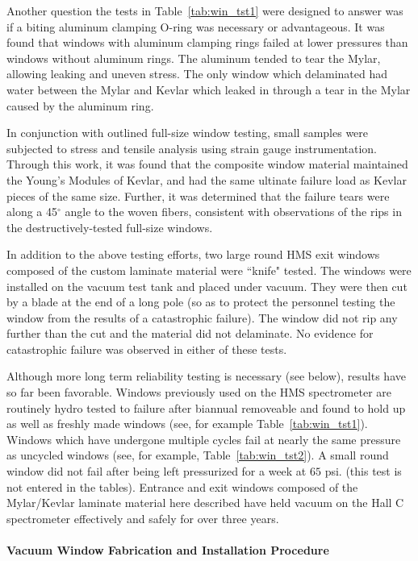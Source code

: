 Another question the tests in Table~\ref{tab:win_tst1} were designed to
answer was if
a biting aluminum clamping O-ring was necessary or advantageous. It was found
that windows with aluminum clamping rings failed at lower pressures than
windows without aluminum rings. The aluminum tended to tear the Mylar, allowing
leaking and uneven stress. The only window which delaminated had water between
the Mylar and Kevlar which leaked in through a tear in the
Mylar caused by the aluminum ring.

In conjunction with outlined full-size window testing, small samples
were subjected to stress and tensile analysis using strain gauge
instrumentation.  Through this work, it was found that the composite
window material maintained the Young's Modules of Kevlar, and had the
same ultinate failure load as Kevlar pieces of the same size.
Further, it was determined that the failure tears were along a
45$^{\circ}$ angle to the woven fibers, consistent with observations
of the rips in the destructively-tested full-size windows.  

In addition to the above testing efforts, two large round HMS exit windows
composed of the custom laminate material were ``knife" tested. The windows
were installed on the vacuum test tank and placed under vacuum. They were then
cut by a blade at the end of a long pole (so as to protect the personnel
testing the window from the results of a catastrophic failure). The window
did not rip any further than the cut and the
material did not delaminate. No evidence for catastrophic failure
was observed in either of these tests.

Although more long term reliability testing is necessary (see below),
results have so far been favorable.
Windows previously used on the HMS spectrometer are routinely hydro
tested to failure after biannual removeable and found to
hold up as well as freshly made windows (see, for example
Table~\ref{tab:win_tst1}).  Windows which have undergone multiple cycles fail at nearly the same pressure as uncycled
windows (see, for example, Table~\ref{tab:win_tst2}). A small round window did not fail after
being left pressurized for
a week at $65$ psi. (this test is not entered in the tables).
Entrance and exit windows composed of the Mylar/Kevlar laminate
material here described have held vacuum on the Hall C
spectrometer effectively and safely for over three years.


\paragraph{Vacuum Window Fabrication and Installation Procedure}

